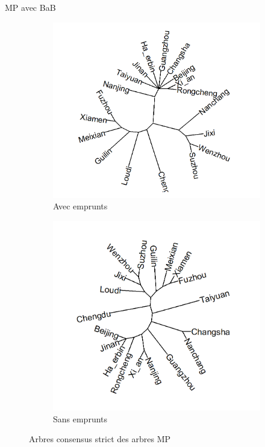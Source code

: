\documentclass[11pt]{beamer}
\begin{document}
\begin{frame}{MP avec BaB}
\begin{figure}[htbp]
\flushleft
\begin{subfigure}{.4\textwidth}
\centering
\includegraphics[scale=.2]{Figure/MP_bab_sc_with}
\caption{Avec emprunts}
\end{subfigure}
\begin{subfigure}{.4\textwidth}
\centering
\includegraphics[scale=.2]{Figure/MP_bab_sc_without}
\caption{Sans emprunts}
\end{subfigure}
\caption{Arbres consensus strict des arbres MP}
\label{Fig:MPR_BAB}
\end{figure}
\end{frame}
\end{document}
